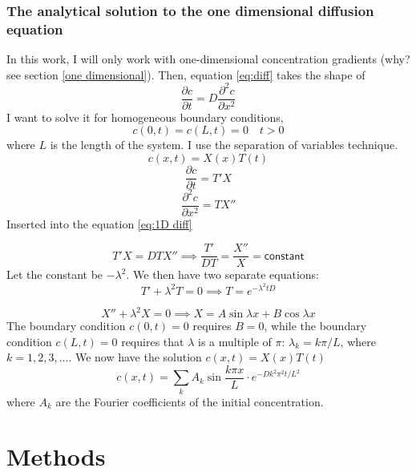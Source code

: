 \documentclass{article}
\begin{document}
\subsubsection{The analytical solution to the one dimensional diffusion equation}\label{analytical solution}
In this work, I will only work with one-dimensional concentration gradients (why? see section \ref{one dimensional}). Then, equation \ref{eq:diff} takes the shape of
\begin{equation}\label{eq:1D diff}
\frac{\partial c}{\partial t} = D\frac{\partial^2 c}{\partial x^2}
\end{equation}
I want to solve it for homogeneous boundary conditions, 
$$c(0,t) = c(L,t)=0 \quad t>0$$ where $L$ is the length of the system. I use the separation of variables technique. 
\begin{equation*}
c(x,t) = X(x)T(t)
\end{equation*}
\begin{equation*}
\frac{\partial c}{\partial t} = T'X
\end{equation*}
\begin{equation*}
\frac{\partial^2 c}{\partial x^2} = TX''
\end{equation*}
Inserted into the equation \ref{eq:1D diff}

\begin{equation*}
T'X  = DTX''\implies \frac{T'}{DT} = \frac{X''}{X} =\mathsf{ constant}
\end{equation*}
Let the constant be $-\lambda ^2$. We then have two separate equations:
\begin{equation*}
T' + \lambda^2 T = 0 \implies T=e^{-\lambda^2 tD}
\end{equation*}

\begin{equation*}
X'' + \lambda^2X = 0 \implies X=A \sin \lambda x + B\cos \lambda x
\end{equation*}
The boundary condition $c(0,t) = 0$ requires $B=0$, while the boundary condition $c(L,t)=0$ requires that $\lambda$ is a multiple of $\pi$: $\lambda_k = k\pi /L$, where $k = 1,2,3,...$. 
We now have the solution $c(x,t)=X(x)T(t)$
\begin{equation}\label{eq:c(x,t)}
c(x,t) = \sum_k A_k \sin \frac{k \pi x}{L}\cdot e^{-Dk^2\pi^2 t /L^2}
\end{equation}
where $A_k$ are the Fourier coefficients of the initial concentration.


\section{Methods}
\end{document}
